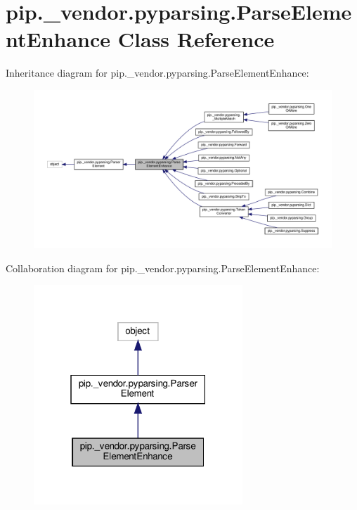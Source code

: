 \hypertarget{classpip_1_1__vendor_1_1pyparsing_1_1ParseElementEnhance}{}\section{pip.\+\_\+vendor.\+pyparsing.\+Parse\+Element\+Enhance Class Reference}
\label{classpip_1_1__vendor_1_1pyparsing_1_1ParseElementEnhance}


Inheritance diagram for pip.\+\_\+vendor.\+pyparsing.\+Parse\+Element\+Enhance\+:
\nopagebreak
\begin{figure}[H]
\begin{center}
\leavevmode
\includegraphics[width=350pt]{classpip_1_1__vendor_1_1pyparsing_1_1ParseElementEnhance__inherit__graph}
\end{center}
\end{figure}


Collaboration diagram for pip.\+\_\+vendor.\+pyparsing.\+Parse\+Element\+Enhance\+:
\nopagebreak
\begin{figure}[H]
\begin{center}
\leavevmode
\includegraphics[width=223pt]{classpip_1_1__vendor_1_1pyparsing_1_1ParseElementEnhance__coll__graph}
\end{center}
\end{figure}
